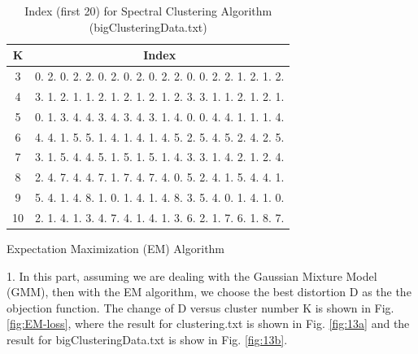 \begin{description}
\begin{description}
\begin{table}[H]
	\centering
	\caption{Index (first 20) for Spectral Clustering Algorithm (bigClusteringData.txt)}
	\label{table:index_spectral_bigClustering}	
	\begin{tabular}{ c | c }
		\hline \hline
		K    & Index \\[0.1cm]
		\hline
		3     &  0.  2.  0.  2.  2.  0.  2.  0.  2.  0.  2.  2.  0.  0.  2.  2.  1.  2.  1.  2. \\[0.1cm]
		4     &  3.  1.  2.  1.  1.  2.  1.  2.  1.  2.  1.  2.  3.  3.  1.  1.  2.  1.  2.  1. \\[0.1cm]
		5     &  0.  1.  3.  4.  4.  3.  4.  3.  4.  3.  1.  4.  0.  0.  4.  4.  1.  1.  1.  4. \\[0.1cm]
		6     &  4.  4.  1.  5.  5.  1.  4.  1.  4.  1.  4.  5.  2.  5.  4.  5.  2.  4.  2.  5. \\[0.1cm]
		7     &  3.  1.  5.  4.  4.  5.  1.  5.  1.  5.  1.  4.  3.  3.  1.  4.  2.  1.  2.  4. \\[0.1cm]
		8     &  2.  4.  7.  4.  4.  7.  1.  7.  4.  7.  4.  0.  5.  2.  4.  1.  5.  4.  4.  1. \\[0.1cm]
		9     &  5.  4.  1.  4.  8.  1.  0.  1.  4.  1.  4.  8.  3.  5.  4.  0.  1.  4.  1.  0. \\[0.1cm]
		10   &  2.  1.  4.  1.  3.  4.  7.  4.  1.  4.  1.  3.  6.  2.  1.  7.  6.  1.  8.  7. \\[0.1cm]
		\hline	
	\end{tabular}
\end{table}

\end{description}


\item[(\Romannum{5}).] Expectation Maximization (EM) Algorithm

\begin{description}
\item{1.} In this part, assuming we are dealing with the Gaussian Mixture Model (GMM), then with the EM algorithm, we choose the best distortion D as the the objection function. The change of D versus cluster number K is shown in Fig. \ref{fig:EM-loss}, where the result for clustering.txt is shown in Fig. \ref{fig:13a} and the result for bigClusteringData.txt is show in Fig. \ref{fig:13b}.


\end{description}
\end{description}
